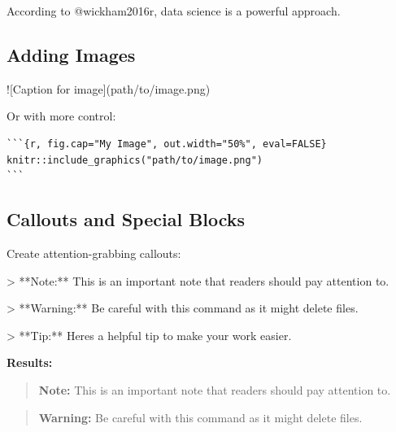 \documentclass[
]{book}
\newenvironment{Shaded}{\begin{snugshade}}{\end{snugshade}}
\newcommand{\AlertTok}[1]{\textcolor[rgb]{0.94,0.16,0.16}{#1}}
\newcommand{\AttributeTok}[1]{\textcolor[rgb]{0.13,0.29,0.53}{#1}}
\newcommand{\NormalTok}[1]{#1}
\begin{document}
\begin{Shaded}
\begin{Highlighting}[]
\NormalTok{According to @wickham2016r, data science is a powerful approach.}
\end{Highlighting}
\end{Shaded}

\subsection{Adding Images}\label{adding-images}

\begin{Shaded}
\begin{Highlighting}[]
\AlertTok{![Caption for image](path/to/image.png)}
\end{Highlighting}
\end{Shaded}

Or with more control:

\begin{verbatim}
```{r, fig.cap="My Image", out.width="50%", eval=FALSE}
knitr::include_graphics("path/to/image.png")
```
\end{verbatim}

\subsection{Callouts and Special Blocks}\label{callouts-and-special-blocks}

Create attention-grabbing callouts:

\begin{Shaded}
\begin{Highlighting}[]
\AttributeTok{\textgreater{} **Note:** This is an important note that readers should pay attention to.}

\AttributeTok{\textgreater{} **Warning:** Be careful with this command as it might delete files.}

\AttributeTok{\textgreater{} **Tip:** Here\textquotesingle{}s a helpful tip to make your work easier.}
\end{Highlighting}
\end{Shaded}

\textbf{Results:}

\begin{quote}
\textbf{Note:} This is an important note that readers should pay attention to.
\end{quote}

\begin{quote}
\textbf{Warning:} Be careful with this command as it might delete files.
\end{quote}
\end{document}
